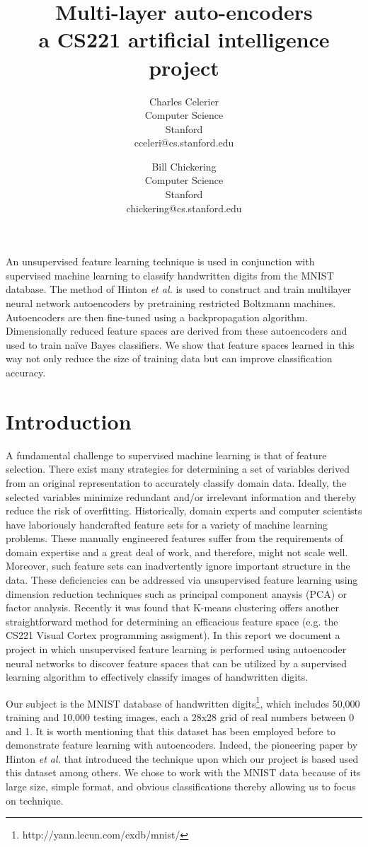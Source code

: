 \documentclass{article}
\title{Multi-layer auto-encoders \\
    \large{a CS221 artificial intelligence project}}
\author{
    Charles Celerier \\
    Computer Science \\
    Stanford \\
    cceleri@cs.stanford.edu
  \and
    Bill Chickering \\
    Computer Science \\
    Stanford \\
    chickering@cs.stanford.edu
}
\begin{document}
\maketitle

An unsupervised feature learning technique is used in conjunction with
supervised machine learning to classify handwritten digits from the MNIST
database. The method of Hinton {\em et al.}\cite{art:HS} is used to construct and
train multilayer neural network autoencoders by pretraining restricted Boltzmann
machines. Autoencoders are then fine-tuned using a backpropagation algorithm.
Dimensionally reduced feature spaces are derived from these autoencoders and
used to train na\"{i}ve Bayes classifiers. We show that feature spaces learned in
this way not only reduce the size of training data but can improve classification
accuracy.

\section{Introduction}\label{sec:introduction}

A fundamental challenge to supervised machine learning is that of feature
selection. There exist many strategies for determining a set of variables
derived from an original representation to accurately classify domain data.
Ideally, the selected variables minimize redundant and/or irrelevant information
and thereby reduce the risk of overfitting. Historically, domain experts and
computer scientists have laboriously handcrafted feature sets for a variety of
machine learning problems. These manually engineered features suffer from the
requirements of domain expertise and a great deal of work, and therefore, might
not scale well. Moreover, such feature sets can inadvertently ignore important
structure in the data. These deficiencies can be addressed via unsupervised
feature learning using dimension reduction techniques such as principal
component anaysis (PCA) or factor analysis. Recently it was found that K-means
clustering offers another straightforward method for determining an efficacious
feature space (e.g. the CS221 Visual Cortex programming assigment). In this
report we document a project in which unsupervised feature learning is performed
using autoencoder neural networks to discover feature spaces that can be
utilized by a supervised learning algorithm to effectively classify images of
handwritten digits.

Our subject is the MNIST database of handwritten
digits\footnote{http://yann.lecun.com/exdb/mnist/}, which includes 50,000
training and 10,000 testing images, each a 28x28 grid of real numbers between 0
and 1. It is worth mentioning that this dataset has been employed before to
demonstrate feature learning with autoencoders. Indeed, the pioneering paper by
Hinton {\em et al.}\cite{art:HS} that introduced the technique upon which our
project is based used this dataset among others. We chose to work with the MNIST
data because of its large size, simple format, and obvious classifications
thereby allowing us to focus on technique.
\end{document}
